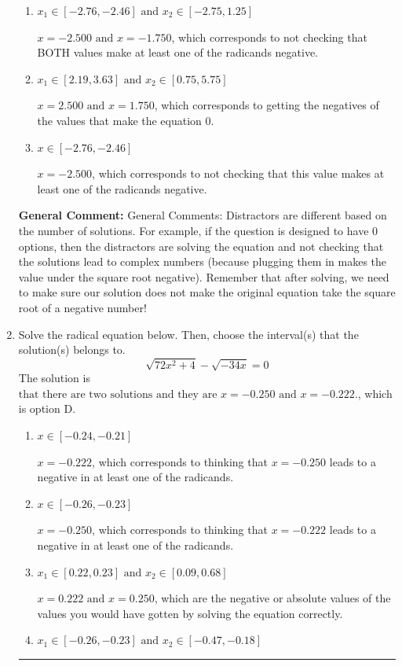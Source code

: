 \documentclass{extbook}[14pt]
\newcommand{\litem}[1]{\item #1

\rule{\textwidth}{0.4pt}}
\begin{document}
\begin{enumerate}
{\begin{enumerate}[label=\Alph*.]
* This is the correct option.
\item \( x_1 \in [-2.76, -2.46] \text{ and } x_2 \in [-2.75,1.25] \)

$x = -2.500 \text{ and } x = -1.750$, which corresponds to not checking that BOTH values make at least one of the radicands negative.
\item \( x_1 \in [2.19, 3.63] \text{ and } x_2 \in [0.75,5.75] \)

$x = 2.500 \text{ and } x = 1.750$, which corresponds to getting the negatives of the values that make the equation 0.
\item \( x \in [-2.76,-2.46] \)

$x = -2.500$, which corresponds to not checking that this value makes at least one of the radicands negative.
\end{enumerate}

\textbf{General Comment:} General Comments: Distractors are different based on the number of solutions. For example, if the question is designed to have 0 options, then the distractors are solving the equation and not checking that the solutions lead to complex numbers (because plugging them in makes the value under the square root negative). Remember that after solving, we need to make sure our solution does not make the original equation take the square root of a negative number!
}
\litem{
Solve the radical equation below. Then, choose the interval(s) that the solution(s) belongs to.
\[ \sqrt{72 x^2 + 4} - \sqrt{-34 x} = 0 \]
The solution is \( \text{that there are two solutions and they are } x = -0.250 \text{ and } x = -0.222. \), which is option D.\begin{enumerate}[label=\Alph*.]
\item \( x \in [-0.24,-0.21] \)

$x = -0.222$, which corresponds to thinking that $x = -0.250$ leads to a negative in at least one of the radicands.
\item \( x \in [-0.26,-0.23] \)

$x = -0.250$, which corresponds to thinking that $x = -0.222$ leads to a negative in at least one of the radicands.
\item \( x_1 \in [0.22, 0.23] \text{ and } x_2 \in [0.09,0.68] \)

$x = 0.222 \text{ and } x = 0.250$, which are the negative or absolute values of the values you would have gotten by solving the equation correctly.
\item \( x_1 \in [-0.26, -0.23] \text{ and } x_2 \in [-0.47,-0.18] \)


\end{enumerate}}
\end{enumerate}
\end{document}
